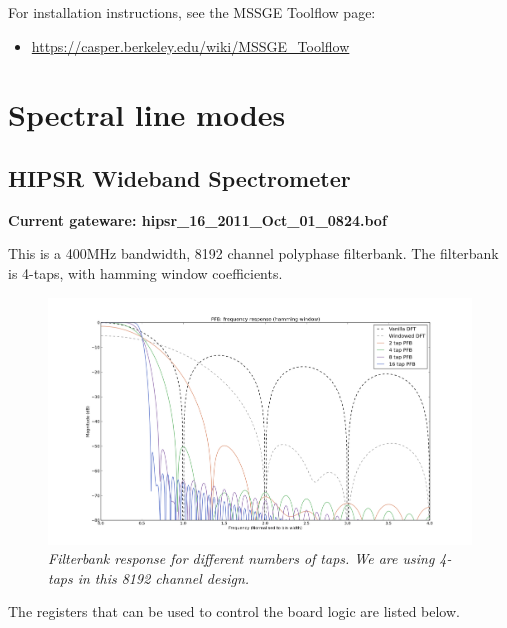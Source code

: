 \documentclass[letterpaper,10pt,english]{sphinxmanual}
\begin{document}
For installation instructions, see the MSSGE Toolflow page:
\begin{itemize}
\item {} 
\href{https://casper.berkeley.edu/wiki/MSSGE\_Toolflow}{https://casper.berkeley.edu/wiki/MSSGE\_Toolflow}

\end{itemize}


\section{Spectral line modes}
\label{gateware:spectral-line-modes}

\subsection{HIPSR Wideband Spectrometer}
\label{gateware:hipsr-wideband-spectrometer}
\textbf{Current gateware: hipsr\_16\_2011\_Oct\_01\_0824.bof}

This is a 400MHz bandwidth, 8192 channel polyphase filterbank. The filterbank
is 4-taps, with hamming window coefficients.
\begin{figure}[htbp]
\centering
\capstart

\includegraphics{PFB_response.png}
\caption{\emph{Filterbank response for different numbers of taps. We are using 4-taps in
this 8192 channel design.}}\end{figure}

The registers that can be used to control the board logic are listed below.
\end{document}
